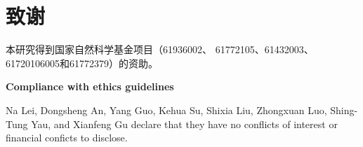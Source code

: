 
\section*{致谢}

本研究得到国家自然科学基金项目（61936002、
61772105、61432003、61720106005和61772379）的资助。

\textbf{Compliance with ethics guidelines}

Na Lei, Dongsheng An, Yang Guo, Kehua Su, Shixia 
Liu, Zhongxuan Luo, Shing-Tung Yau, and Xianfeng Gu 
declare that they have no conflicts of interest or financial 
conficts to disclose.